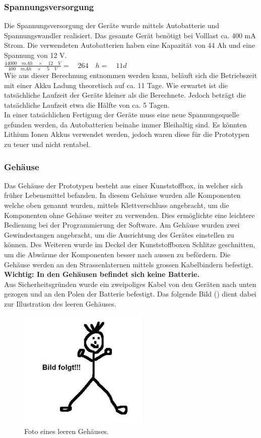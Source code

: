 \subsubsection{Spannungsversorgung}
Die Spannungsversorgung der Geräte wurde mittels Autobatterie und Spannungswandler realisiert. Das gesamte Gerät benötigt bei Volllast ca. 400 mA Strom. Die verwendeten Autobatterien haben eine Kapazität von 44 Ah und eine Spannung von 12 V. \\

$\frac { 44000\quad mAh\quad \times \quad 12\quad V }{ 400\quad mAh\quad \times \quad 5\quad V } =\quad 264\quad h=\quad 11 d$ \\

Wie aus dieser Berechnung entnommen werden kann, beläuft sich die Betriebszeit mit einer Akku Ladung theoretisch auf ca. 11 Tage. Wie erwartet ist die tatsächliche Laufzeit der Geräte kleiner als die Berechnete. Jedoch beträgt die tatsächliche Laufzeit etwa die Hälfte von ca. 5 Tagen. \\
In einer tatsächlichen Fertigung der Geräte muss eine neue Spannungsquelle gefunden werden, da Autobatterien beinahe immer Bleihaltig sind. Es könnten Lithium Ionen Akkus verwendet werden, jedoch waren diese für die Prototypen zu teuer und nicht rentabel. 

\subsubsection{Gehäuse}
Das Gehäuse der Prototypen besteht aus einer Kunststoffbox, in welcher sich früher Lebensmittel befanden. In diesem Gehäuse wurden alle Komponenten welche oben genannt wurden, mittels Klettverschluss angebracht, um die Komponenten ohne Gehäuse weiter zu verwenden. Dies ermöglichte eine leichtere Bedienung bei der Programmierung der Software. Am Gehäuse wurden zwei Gewindestangen angebracht, um die Ausrichtung des Gerätes einstellen zu können. Des Weiteren wurde im Deckel der Kunststoffboxen Schlitze geschnitten, um die Abwärme der Komponenten besser nach aussen zu befördern. Die Gehäuse werden an den Strassenlaternen mittels grossen Kabelbindern befestigt.\\
\textbf{Wichtig: In den Gehäusen befindet sich keine Batterie.}\\
Aus Sicherheitsgründen wurde ein zweipoliges Kabel von den Geräten nach unten gezogen und an den Polen der Batterie befestigt. Das folgende Bild () dient dabei zur Illustration des leeren Gehäuses.

\begin{figure}[H]
  \centering
  \includegraphics[height=0.49\textwidth]{Hardware/Gehaeuse.jpg} 
  \caption{Foto eines leeren Gehäuses.}
  \label{bGehäuse}
\end{figure}